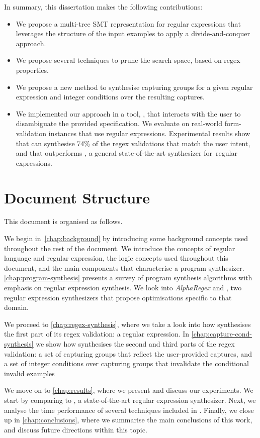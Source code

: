 In summary, this dissertation makes the following contributions:
%
\begin{itemize}
    \item We propose a multi-tree SMT representation for regular expressions that leverages the structure of the input examples to apply a divide-and-conquer approach.
    
    \item We propose several techniques to prune the search space, based on regex properties.
    
    \item We propose a new method to synthesise capturing groups for a given regular expression and integer conditions over the resulting captures.
    
    \item We implemented our approach in a tool, \Forest{}, that interacts with the user to disambiguate the provided specification. We evaluate \Forest{} on real-world form-validation instances that use regular expressions. Experimental results show that \Forest can synthesise 74\% of the regex validations that match the user intent, and that \Forest{} outperforms \Regel, a general state-of-the-art synthesizer for~regular expressions.
\end{itemize}

\section{Document Structure}

This document is organised as follows.

We begin in~\autoref{chap:background} by introducing some background concepts used throughout the rest of the document. We introduce the concepts of regular language and regular expression, the logic concepts used throughout this document, and the main components that characterise a program synthesizer.
%
\autoref{chap:program-synthesis} presents a survey of program synthesis algorithms with emphasis on regular expression synthesis.
%
We look into \textit{AlphaRegex} and \Regel, two regular expression synthesizers that propose optimisations specific to that domain.

We proceed to \autoref{chap:regex-synthesis}, where we take a look into how \Forest synthesises the first part of its regex validation: a regular expression.
%
In \autoref{chap:capture-cond-synthesis} we show how \Forest synthesises the second and third parts of the regex validation: a set of capturing groups that reflect the user-provided captures, and a set of integer conditions over capturing groups that invalidate the conditional invalid examples

We move on to \autoref{chap:results}, where we present and discuss our experiments. We start by comparing \Forest to \Regel, a state-of-the-art regular expression synthesizer. Next, we analyse the time performance of several techniques included in \Forest.
%
Finally, we close up in \autoref{chap:conclusions}, where we summarise the main conclusions of this work, and discuss future directions within this topic.

